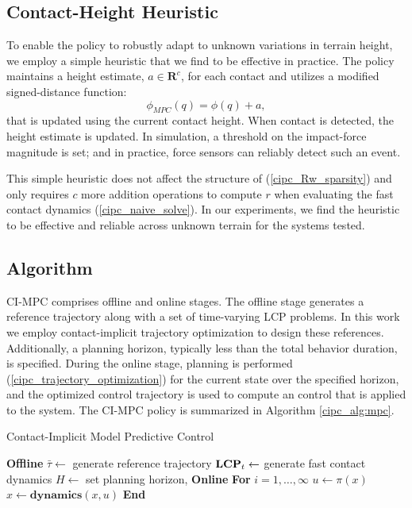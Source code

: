 \subsection{Contact-Height Heuristic}
To enable the policy to robustly adapt to unknown variations in terrain height, we employ a simple heuristic that we find to be effective in practice. The policy maintains a height estimate, $a \in \mathbf{R}^c$, for each contact and utilizes a modified signed-distance function:
\begin{equation}
	\phi_{MPC}(q) = \phi(q) + a,
\end{equation}
that is updated using the current contact height. When contact is detected, the height estimate is updated. In simulation, a threshold on the impact-force magnitude is set; and in practice, force sensors can reliably detect such an event.

This simple heuristic does not affect the structure of (\ref{cipc_Rw_sparsity}) and only requires $c$ more addition operations to compute $r$ when evaluating the fast contact dynamics (\ref{cipc_naive_solve}). In our experiments, we find the heuristic to be effective and reliable across unknown terrain for the systems tested.

\subsection{Algorithm}
CI-MPC comprises offline and online stages. The offline stage generates a reference trajectory along with a set of time-varying LCP problems. In this work we employ contact-implicit trajectory optimization \cite{manchester2020variational} to design these references. Additionally, a planning horizon, typically less than the total behavior duration, is specified. During the online stage, planning is performed (\ref{cipc_trajectory_optimization}) for the current state over the specified horizon, and the optimized control trajectory is used to compute an control that is applied to the system. The CI-MPC policy is summarized in Algorithm \ref{cipc_alg:mpc}. 

\begin{algorithm}[H]
	\caption{Contact-Implicit Model Predictive Control}\label{cipc_alg:mpc}
	\begin{algorithmic}[1]
		\State \textbf{Offline}  
		\State \indent $\bar{\tau} \leftarrow$ generate reference trajectory
		\State \indent $\mbox{\textbf{LCP}}_t \leftarrow$ generate fast contact dynamics
		\State \indent $H \leftarrow$ set planning horizon, 
		\State \textbf{Online}  
		\State \indent \textbf{For} $i = 1, \ldots, \infty$
		\State \indent \indent $u \leftarrow \pi(x)$ 
		\State \indent \indent $x \leftarrow \textbf{dynamics}(x, u)$
		\State \indent \textbf{End} 
	\end{algorithmic}
\end{algorithm}

